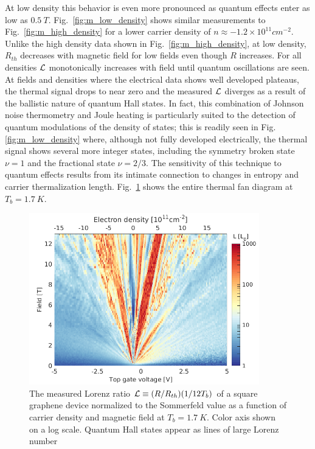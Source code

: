 At low density this behavior is even more pronounced as quantum effects enter as low as $0.5~T$. Fig.~\ref{fig:m_low_density} shows similar measurements to Fig.~\ref{fig:m_high_density} for a lower carrier density of $n\approx-1.2\times10^{11}cm^{-2}$. Unlike the high density data shown in Fig.~\ref{fig:m_high_density}, at low density, $R_{th}$ decreases with magnetic field for low fields even though $R$ increases. For all densities $\mathcal{L}$ monotonically increases with field until quantum oscillations are seen. At fields and densities where the electrical data shows well developed plateaus, the thermal signal drops to near zero and the measured $\mathcal{L}$ diverges as a result of the ballistic nature of quantum Hall states. In fact, this combination of Johnson noise thermometry and Joule heating is particularly suited to the detection of quantum modulations of the density of states; this is readily seen in Fig.\ref{fig:m_low_density} where, although not fully developed electrically, the thermal signal shows several more integer states, including the symmetry broken state $\nu=1$ and the fractional state $\nu = 2/3$. The sensitivity of this technique to quantum effects results from its intimate connection to changes in entropy and carrier thermalization length. Fig.~\ref{fig:m_L} shows the entire thermal fan diagram at $T_b=1.7~K$.
\begin{figure}
\centering
\includegraphics[width=100mm]{figures/magneto/Fan_L.png}
\caption{The measured Lorenz ratio $\mathcal{L} \equiv (R/R_{th})(1/12T_b)$ of a square graphene device normalized to the Sommerfeld value as a function of carrier density and magnetic field at $T_b=1.7~K$. Color axis shown on a log scale. Quantum Hall states appear as lines of large Lorenz number}
\label{fig:m_L}
\end{figure}

